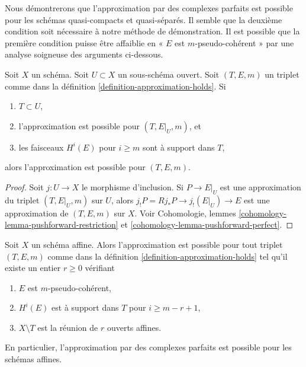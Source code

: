 \noindent
Nous démontrerons que l'approximation par des complexes parfaits est possible pour les
schémas quasi-compacts et quasi-séparés. Il semble que la deuxième
condition soit nécessaire à notre méthode de démonstration. Il est possible que la
première condition puisse être affaiblie en « $E$ est $m$-pseudo-cohérent »
par une analyse soigneuse des arguments ci-dessous.

\begin{lemma}
\label{lemma-open}
Soit $X$ un schéma. Soit $U \subset X$ un sous-schéma ouvert.
Soit $(T, E, m)$ un triplet comme dans la
définition \ref{definition-approximation-holds}.
Si
\begin{enumerate}
\item $T \subset U$,
\item l'approximation est possible pour $(T, E|_U, m)$, et
\item les faisceaux $H^i(E)$ pour $i \geq m$ sont à support dans $T$,
\end{enumerate}
alors l'approximation est possible pour $(T, E, m)$.
\end{lemma}

\begin{proof}
Soit $j : U \to X$ le morphisme d'inclusion.
Si $P \to E|_U$ est une approximation du triplet $(T, E|_U, m)$
sur $U$, alors $j_!P = Rj_*P \to j_!(E|_U) \to E$ est une approximation
de $(T, E, m)$ sur $X$.
Voir Cohomologie, lemmes \ref{cohomology-lemma-pushforward-restriction} et
\ref{cohomology-lemma-pushforward-perfect}.
\end{proof}

\begin{lemma}
\label{lemma-approximation-affine}
Soit $X$ un schéma affine. Alors l'approximation est possible pour tout
triplet $(T, E, m)$ comme dans la définition \ref{definition-approximation-holds}
tel qu'il existe un entier $r \geq 0$ vérifiant
\begin{enumerate}
\item $E$ est $m$-pseudo-cohérent,
\item $H^i(E)$ est à support dans $T$ pour $i \geq m - r + 1$,
\item $X \setminus T$ est la réunion de $r$ ouverts affines.
\end{enumerate}
En particulier, l'approximation par des complexes parfaits est possible pour les schémas affines.
\end{lemma}

